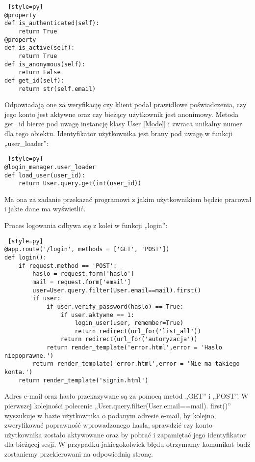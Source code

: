 \documentclass{xmgr}
\begin{document}
\newpage
\begin{lstlisting} [style=py] 
@property
def is_authenticated(self):
    return True
@property       
def is_active(self):
    return True
def is_anonymous(self):
    return False
def get_id(self):
   	return str(self.email)
\end{lstlisting}

Odpowiadają one za weryfikację czy klient podał prawidłowe poświadczenia, czy jego konto jest aktywne oraz czy bieżący użytkownik jest anonimowy. Metoda get\_id bierze pod uwagę instancję klasy User \ref{Model} i zwraca unikalny numer dla tego obiektu. Identyfikator użytkownika jest brany pod uwagę w funkcji „user\_loader”:

\begin{lstlisting} [style=py] 
@login_manager.user_loader
def load_user(user_id):
    return User.query.get(int(user_id))
\end{lstlisting}

Ma ona za zadanie przekazać programowi z jakim użytkownikiem będzie pracował i jakie dane ma wyświetlić. 

Proces logowania odbywa się z kolei w funkcji „login”:

\begin{lstlisting} [style=py] 
@app.route('/login', methods = ['GET', 'POST'])
def login():
    if request.method == 'POST':
        haslo = request.form['haslo']
        mail = request.form['email']
        user=User.query.filter(User.email==mail).first()
        if user:
            if user.verify_password(haslo) == True:
                if user.aktywne == 1:
                    login_user(user, remember=True)
                    return redirect(url_for('list_all'))             
                return redirect(url_for('autoryzacja'))
            return render_template('error.html',error = 'Haslo niepoprawne.')
        return render_template('error.html',error = 'Nie ma takiego konta.')       
    return render_template('signin.html')
\end{lstlisting}

Adres e-mail oraz hasło przekazywane są za pomocą metod „GET” i „POST”. W pierwszej kolejności  polecenie „User.query.filter(User.email==mail). first()” wyszukuje w bazie użytkownika o podanym adresie e-mail, by kolejno, zweryfikować poprawność wprowadzonego hasła, sprawdzić czy konto użytkownika zostało aktywowane oraz by pobrać i zapamiętać jego identyfikator dla bieżącej sesji. W przypadku jakiegokolwiek błędu otrzymamy komunikat bądź zostaniemy przekierowani na odpowiednią stronę. 
\end{document}
